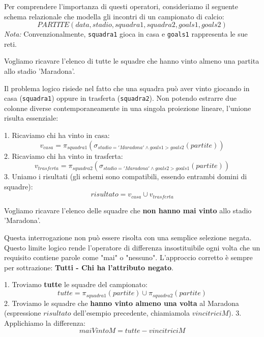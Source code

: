 \medskip

Per comprendere l'importanza di questi operatori, consideriamo il seguente schema relazionale che modella gli incontri di un campionato di calcio:
$$ PARTITE(data, stadio, squadra1, squadra2, goals1, goals2) $$
\textit{Nota:} Convenzionalmente, \texttt{squadra1} gioca in casa e \texttt{goals1} rappresenta le sue reti.

\begin{example}
    Vogliamo ricavare l'elenco di tutte le squadre che hanno vinto almeno una partita allo stadio 'Maradona'.
    
    Il problema logico risiede nel fatto che una squadra può aver vinto giocando in casa (\texttt{squadra1}) oppure in trasferta (\texttt{squadra2}). Non potendo estrarre due colonne diverse contemporaneamente in una singola proiezione lineare, l'unione risulta essenziale:
    
    1. Ricaviamo chi ha vinto in casa: 
    $$ v_{casa} = \pi_{squadra1}(\sigma_{stadio='Maradona' \land goals1 > goals2}(partite)) $$
    2. Ricaviamo chi ha vinto in trasferta:
    $$ v_{trasferta} = \pi_{squadra2}(\sigma_{stadio='Maradona' \land goals2 > goals1}(partite)) $$
    3. Uniamo i risultati (gli schemi sono compatibili, essendo entrambi domini di squadre):
    $$ risultato = v_{casa} \cup v_{trasferta} $$
\end{example}

\begin{example}
    Vogliamo ricavare l'elenco delle squadre che \textbf{non hanno mai vinto} allo stadio 'Maradona'.
    
    Questa interrogazione non può essere risolta con una semplice selezione negata. Questo limite logico rende l'operatore di differenza insostituibile ogni volta che un requisito contiene parole come "mai" o "nessuno". L'approccio corretto è sempre per sottrazione: \textbf{Tutti - Chi ha l'attributo negato}.
    
    1. Troviamo \textbf{tutte} le squadre del campionato:
    $$ tutte = \pi_{squadra1}(partite) \cup \pi_{squadra2}(partite) $$
    2. Troviamo le squadre che \textbf{hanno vinto almeno una volta} al Maradona (espressione $risultato$ dell'esempio precedente, chiamiamola $vincitriciM$).
    3. Applichiamo la differenza:
    $$ maiVintoM = tutte - vincitriciM $$
\end{example}

